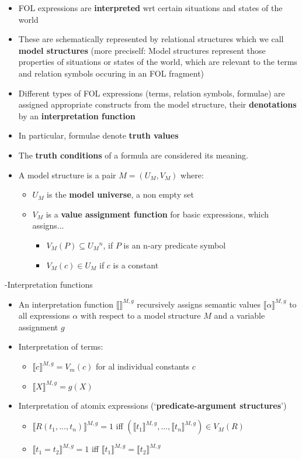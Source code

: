 \documentclass[11pt]{article}
\begin{document}
\begin{itemize}
 \item FOL expressions are {\bf interpreted} wrt certain situations and states of the world
 \item These are schematically represented by relational structures which we call {\bf model structures} (more preciself: Model structures represent those properties of situations or states of the world, which are relevant to the terms and relation symbols occuring in an FOL fragment)
 \item Different types of FOL expressions (terms, relation symbols, formulae) are assigned appropriate constructs from the model structure, their {\bf denotations} by an {\bf interpretation function}
 \item In particular, formulae denote {\bf truth values}
 \item The {\bf truth conditions} of a formula are considered its meaning.
 \item A model structure is a pair $M = (U_M , V_M)$ where:
\begin{itemize}
 \item $U_M$ is the {\bf model universe}, a non empty set
 \item $V_M$ is a {\bf value assignment function} for basic expressions, which assigns...
\begin{itemize}
 \item $V_M (P) \subseteq U{_M}^n$, if $P$ is an n-ary predicate symbol
 \item $V_M (c) \in U_M$ if $c$ is a constant
\end{itemize} 
\end{itemize}
\end{itemize}
-Interpretation functions
\begin{itemize}
 \item An interpretation function $\llbracket\rrbracket ^{M,g}$ recursively assigns semantic values $\llbracket\alpha\rrbracket^{M,g}$ to all expressions $\alpha$ with respect to a model structure $M$ and a variable assignment $g$
 \item Interpretation of terms:
\begin{itemize}
 \item $\llbracket c\rrbracket^{M,g} = V_m (c)$ for al individual constants $c$
 \item $\llbracket X\rrbracket^{M,g} = g(X)$
\end{itemize}
 \item Interpretation of atomix expressions (`{\bf predicate-argument structures}')
\begin{itemize}
 \item $\llbracket R(t_1 , ..., t_n)\rrbracket^{M,g} = 1$ iff $(\llbracket t_1\rrbracket^{M,g}, ...,\llbracket t_n\rrbracket^{M,g}) \in V_M (R)$ %
 \item $\llbracket t_1 = t_2\rrbracket^{M,g} = 1$ iff $\llbracket t_1\rrbracket^{M,g} = \llbracket t_2\rrbracket^{M,g}$
\end{itemize}
\end{itemize}
\end{document}
